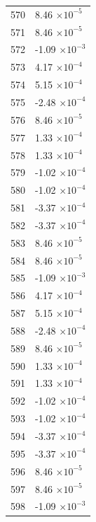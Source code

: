 \documentclass[a4paper,11pt]{article}
\begin{document}
\begin{center}
\begin{longtable}{|R{1.5cm}|R{2.5cm}|}
  570 &         8.46 $\times 10^{          -5}$ \\
  571 &         8.46 $\times 10^{          -5}$ \\
  572 &        -1.09 $\times 10^{          -3}$ \\
  573 &         4.17 $\times 10^{          -4}$ \\
  574 &         5.15 $\times 10^{          -4}$ \\
  575 &        -2.48 $\times 10^{          -4}$ \\
  576 &         8.46 $\times 10^{          -5}$ \\
  577 &         1.33 $\times 10^{          -4}$ \\
  578 &         1.33 $\times 10^{          -4}$ \\
  579 &        -1.02 $\times 10^{          -4}$ \\
  580 &        -1.02 $\times 10^{          -4}$ \\
  581 &        -3.37 $\times 10^{          -4}$ \\
  582 &        -3.37 $\times 10^{          -4}$ \\
  583 &         8.46 $\times 10^{          -5}$ \\
  584 &         8.46 $\times 10^{          -5}$ \\
  585 &        -1.09 $\times 10^{          -3}$ \\
  586 &         4.17 $\times 10^{          -4}$ \\
  587 &         5.15 $\times 10^{          -4}$ \\
  588 &        -2.48 $\times 10^{          -4}$ \\
  589 &         8.46 $\times 10^{          -5}$ \\
  590 &         1.33 $\times 10^{          -4}$ \\
  591 &         1.33 $\times 10^{          -4}$ \\
  592 &        -1.02 $\times 10^{          -4}$ \\
  593 &        -1.02 $\times 10^{          -4}$ \\
  594 &        -3.37 $\times 10^{          -4}$ \\
  595 &        -3.37 $\times 10^{          -4}$ \\
  596 &         8.46 $\times 10^{          -5}$ \\
  597 &         8.46 $\times 10^{          -5}$ \\
  598 &        -1.09 $\times 10^{          -3}$ \\

\end{longtable}
\end{center}
\end{document}

